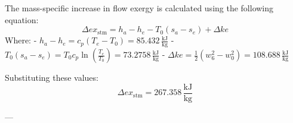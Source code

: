 The mass-specific increase in flow exergy is calculated using the following equation:  
\[
\Delta ex_{\text{stm}} = h_a - h_e - T_0 (s_a - s_e) + \Delta ke
\]  
Where:  
- \( h_a - h_e = c_p (T_e - T_0) = 85.432 \, \frac{\text{kJ}}{\text{kg}} \)  
- \( T_0 (s_a - s_e) = T_0 c_p \ln \left( \frac{T_e}{T_0} \right) = 73.2758 \, \frac{\text{kJ}}{\text{kg}} \)  
- \( \Delta ke = \frac{1}{2} (w_6^2 - w_0^2) = 108.688 \, \frac{\text{kJ}}{\text{kg}} \)  

Substituting these values:  
\[
\Delta ex_{\text{stm}} = 267.358 \, \frac{\text{kJ}}{\text{kg}}
\]  

---